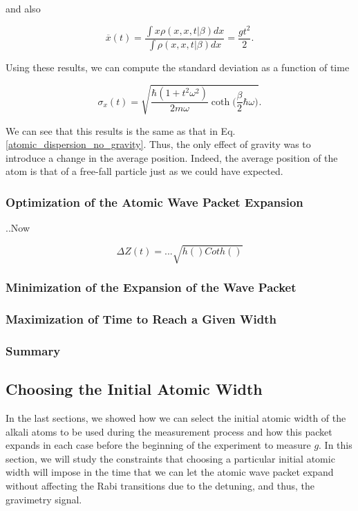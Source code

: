 \documentclass{article}
\begin{document}
and also

\begin{equation}
    \overline{x} (t)= \frac{\int x \rho(x,x,t|\beta) dx}{\int \rho(x,x,t|\beta) dx} =  \frac{g t^{2}}{2}.
\end{equation}

Using these results, we can compute the standard deviation as a function of time

\begin{equation}
    \sigma_{x} (t) = \sqrt{\frac{\hbar (1+t^{2} \omega^{2})}{2 m \omega} \coth \bigg(\frac{\beta}{2} \hbar \omega \bigg)}.
\end{equation}

We can see that this results is the same as that in Eq. \ref{atomic_dispersion_no_gravity}. Thus, the only effect of gravity was to introduce a change in the average position. Indeed, the average position of the atom is that of a free-fall particle just as we could have expected.

\subsubsection{Optimization of the Atomic Wave Packet Expansion}
..Now

\begin{equation}
    \Delta Z(t) = ... \sqrt{h()Coth()}
\end{equation}

\subsubsection{Minimization of the Expansion of the Wave Packet}

\subsubsection{Maximization of Time to Reach a Given Width}

\subsubsection{Summary}

\subsection{Choosing the Initial Atomic Width}
In the last sections, we showed how we can select the initial atomic width of the alkali atoms to be used during the measurement process and how this packet expands in each case before the beginning of the experiment to measure $g$. In this section, we will study the constraints that choosing a particular initial atomic width will impose in the time that we can let the atomic wave packet expand without affecting the Rabi transitions due to the detuning, and thus, the gravimetry signal.
\end{document}
